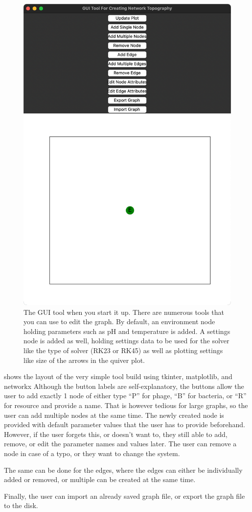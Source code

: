 \begin{figure}
    \centering
    \includegraphics[width=0.5\linewidth]{Screenshots/initial_startup_GUI_tool.png}
    \caption{The GUI tool when you start it up. There are numerous tools that you can use to edit the graph. By default, an environment node holding parameters such as pH and temperature is added. A settings node is added as well, holding settings data to be used for the solver like the type of solver (RK23 or RK45) as well as plotting settings like size of the arrows in the quiver plot. }
    \label{fig:ss:initial_startup_GUI_tool}
\end{figure}
 shows the layout of the very simple tool build using tkinter, matplotlib, and networkx %
Although the button labels are self-explanatory, the buttons allow the user to add exactly 1 node of either type “P” for phage, “B” for bacteria, or “R” for resource and provide a name. 
That is however tedious for large graphs, so the user can add multiple nodes at the same time. 
The newly created node is provided with default parameter values that the user has to provide beforehand. 
However, if the user forgets this, or doesn't want to, they still able to add, remove, or edit the parameter names and values later. 
The user can remove a node in case of a typo, or they want to change the system. 

The same can be done for the edges, where the edges can either be individually added or removed, or multiple can be created at the same time. 

Finally, the user can import an already saved graph file, or export the graph file to the disk. 


